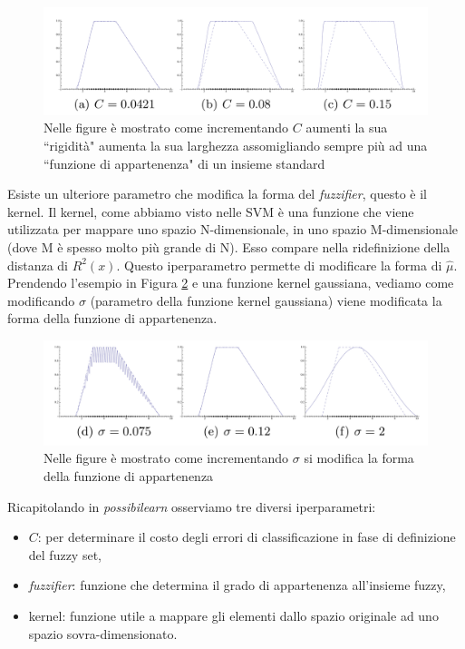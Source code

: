\documentclass[12pt,italian]{report}
\begin{document}
\begin{figure}[h!]
	\center
	\includegraphics[scale=0.2]{../img/possibilearn_c}
	\caption{Nelle figure è mostrato come incrementando $C$ aumenti la sua ``rigidità" aumenta la sua larghezza assomigliando sempre più ad una ``funzione di appartenenza" di un insieme standard}
	\label{fig:possibilearn_c}
\end{figure}

Esiste un ulteriore parametro che modifica la forma del \emph{fuzzifier}, questo è il kernel. Il kernel, come abbiamo visto nelle SVM è una funzione che viene utilizzata per mappare uno spazio N-dimensionale, in uno spazio M-dimensionale (dove M è spesso molto più grande di N). Esso compare nella ridefinizione della distanza di $ R^2(x) $. Questo iperparametro permette di modificare la forma di $\hat \mu$. Prendendo l'esempio in Figura \ref{fig:possibilearn_sigma} e una funzione kernel gaussiana, vediamo come modificando $\sigma$ (parametro della funzione kernel gaussiana) viene modificata la forma della funzione di appartenenza.

\begin{figure}[h!]
	\center
	\includegraphics[scale=0.2]{../img/possibilearn_sigma}
	\caption{Nelle figure è mostrato come incrementando $\sigma$ si modifica la forma della funzione di appartenenza}
	\label{fig:possibilearn_sigma}
\end{figure}

Ricapitolando in \emph{possibilearn} osserviamo tre diversi iperparametri:
\begin{itemize}
	\item $C$: per determinare il costo degli errori di classificazione in fase di definizione del fuzzy set,
	\item \emph{fuzzifier}: funzione che determina il grado di appartenenza all'insieme fuzzy,
	\item kernel: funzione utile a mappare gli elementi dallo spazio originale ad uno spazio sovra-dimensionato.
\end{itemize}
\end{document}
